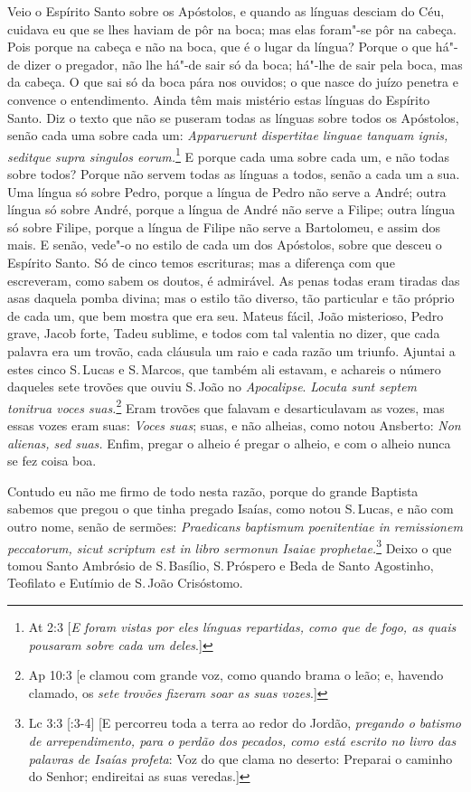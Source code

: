 Veio o Espírito Santo sobre os Apóstolos, e quando as línguas desciam do
Céu, cuidava eu que se lhes haviam de pôr na boca; mas elas foram"-se pôr
na cabeça. Pois porque na cabeça e não na boca, que é o lugar da língua?
Porque o que há"-de dizer o pregador, não lhe há"-de sair só da boca;
há"-lhe de sair pela boca, mas da cabeça. O que sai só da boca pára nos
ouvidos; o que nasce do juízo penetra e convence o entendimento. Ainda
têm mais mistério estas línguas do Espírito Santo. Diz o texto que não
se puseram
todas as línguas sobre todos os Apóstolos, senão cada uma sobre cada um:
\emph{Apparuerunt dispertitae linguae tanquam ignis, seditque supra
singulos eorum.}\footnote{At 2:3 [\emph{E foram vistas por eles línguas repartidas, como que de fogo, as quais pousaram sobre cada um deles}.]} E porque cada uma sobre cada um, e
não todas sobre todos? Porque não servem todas as línguas a todos,
senão a cada um a sua. Uma língua só sobre Pedro, porque a língua de
Pedro não serve a André; outra língua só sobre André, porque a língua de
André não serve a Filipe; outra língua só sobre Filipe, porque a língua
de Filipe não serve a Bartolomeu, e assim dos mais. E senão, vede"-o no
estilo de cada um dos Apóstolos, sobre que desceu o Espírito Santo. Só
de cinco temos escrituras; mas a diferença com que escreveram, como
sabem os doutos, é admirável. As penas todas eram tiradas das asas
daquela pomba divina; mas o estilo tão diverso, tão particular e tão
próprio de cada um, que bem mostra que era seu. Mateus fácil, João
misterioso, Pedro grave, Jacob forte, Tadeu sublime, e todos com tal
valentia no dizer, que cada palavra era um trovão, cada cláusula um raio
e cada razão um triunfo. Ajuntai a estes cinco S.\,Lucas e S.\,Marcos, que
também ali estavam, e achareis o número daqueles sete trovões que
ouviu S.\,João no \emph{Apocalipse}. \emph{Locuta sunt septem tonitrua
voces suas.}\footnote{Ap 10:3 [e clamou com grande voz, como quando brama o leão; e, havendo clamado, os \emph{sete trovões fizeram soar as suas vozes}.]} Eram trovões que falavam e desarticulavam as vozes, mas
essas vozes eram suas: \emph{Voces suas}; suas, e não alheias, como
notou Ansberto: \emph{Non alienas, sed suas.} Enfim, pregar o alheio é
pregar o alheio, e com o alheio nunca se fez coisa boa.

Contudo eu não me firmo de todo nesta razão, porque do grande
Baptista sabemos que pregou o que tinha pregado Isaías, como notou S.\,Lucas, e não com outro nome, senão de sermões: \emph{Praedicans
baptismum poenitentiae in remissionem peccatorum, sicut scriptum est in
libro sermonun Isaiae prophetae.}\footnote{Lc 3:3 [:3-4] [E percorreu toda a terra ao redor do Jordão, \emph{pregando o batismo de arrependimento, para o perdão dos pecados, como está escrito no livro das palavras de Isaías profeta}: Voz do que clama no deserto: Preparai o caminho do Senhor; endireitai as suas veredas.]} Deixo o que tomou Santo Ambrósio de
S.\,Basílio, S.\,Próspero e Beda de Santo Agostinho, Teofilato e Eutímio
de S.\,João Crisóstomo.


